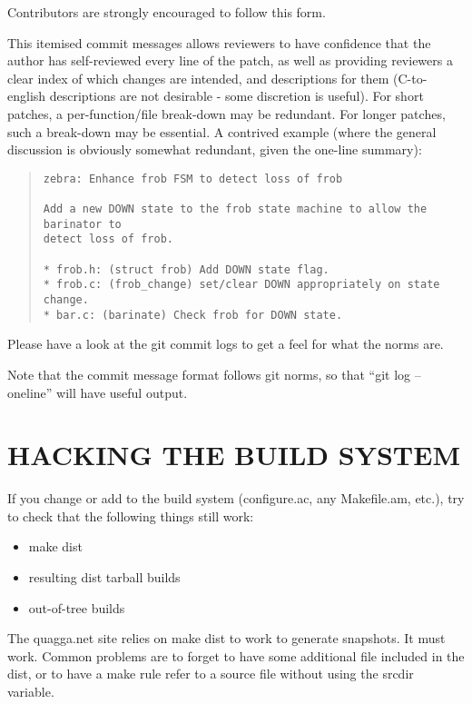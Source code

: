 \documentclass[oneside]{article}
\begin{document}
Contributors are strongly encouraged to follow this form.

This itemised commit messages allows reviewers to have confidence that the
author has self-reviewed every line of the patch, as well as providing
reviewers a clear index of which changes are intended, and descriptions for
them (C-to-english descriptions are not desirable - some discretion is
useful).  For short patches, a per-function/file break-down may be
redundant.  For longer patches, such a break-down may be essential.  A
contrived example (where the general discussion is obviously somewhat
redundant, given the one-line summary):

\begin{quote}\begin{verbatim}
zebra: Enhance frob FSM to detect loss of frob

Add a new DOWN state to the frob state machine to allow the barinator to
detect loss of frob.

* frob.h: (struct frob) Add DOWN state flag.
* frob.c: (frob_change) set/clear DOWN appropriately on state change.
* bar.c: (barinate) Check frob for DOWN state.
\end{verbatim}\end{quote}

Please have a look at the git commit logs to get a feel for what the norms
are.

Note that the commit message format follows git norms, so that ``git
log --oneline'' will have useful output.

\section{HACKING THE BUILD SYSTEM}

If you change or add to the build system (configure.ac, any Makefile.am,
etc.), try to check that the following things still work:

\begin{itemize}
\item make dist
\item resulting dist tarball builds
\item out-of-tree builds
\end{itemize}

The quagga.net site relies on make dist to work to generate snapshots. It
must work. Common problems are to forget to have some additional file
included in the dist, or to have a make rule refer to a source file without
using the srcdir variable.
\end{document}

